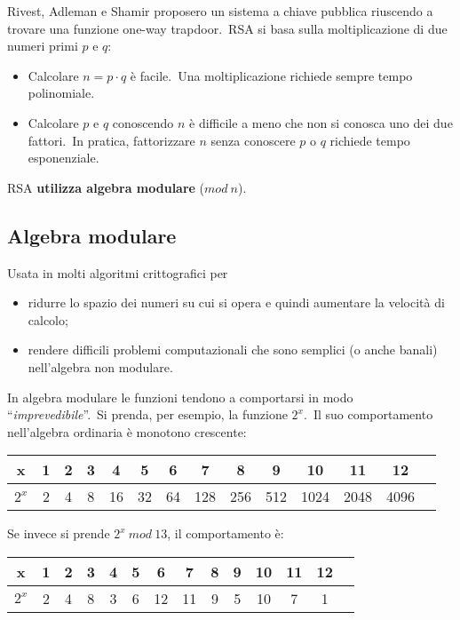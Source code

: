 Rivest, Adleman e Shamir proposero un sistema a chiave pubblica riuscendo a trovare una funzione one-way trapdoor.\
RSA si basa sulla moltiplicazione di due numeri primi $p$ e $q$:

\begin{itemize}
    \item Calcolare $n = p\cdot q$ è facile.\ Una moltiplicazione richiede sempre tempo polinomiale.
    \item Calcolare $p$ e $q$ conoscendo $n$ è difficile a meno che non si conosca uno dei due fattori.\ In pratica, fattorizzare $n$ senza conoscere $p$ o $q$ richiede tempo esponenziale.
\end{itemize}

\noindent RSA \textbf{utilizza algebra modulare} ($\mathit{mod}\ n$).

\subsection{Algebra modulare}

Usata in molti algoritmi crittografici per
\begin{itemize}
    \item ridurre lo spazio dei numeri su cui si opera e quindi aumentare la velocità di calcolo;
    \item rendere difficili problemi computazionali che sono semplici (o anche banali) nell'algebra non modulare.
\end{itemize}

\noindent In algebra modulare le funzioni tendono a comportarsi in modo ``\textit{imprevedibile}''.\
Si prenda, per esempio, la funzione $2^x$.\
Il suo comportamento nell'algebra ordinaria è monotono crescente:

\begin{table}[H]
    \centering
    \begin{tabular}{|c|c|c|c|c|c|c|c|c|c|c|c|c|c|}
        \hline
        x     & 1 & 2 & 3 & 4  & 5  & 6  & 7   & 8   & 9   & 10   & 11   & 12   \\\hline
        $2^x$ & 2 & 4 & 8 & 16 & 32 & 64 & 128 & 256 & 512 & 1024 & 2048 & 4096 \\\hline
    \end{tabular}
\end{table}

\noindent Se invece si prende $2^x\ \mathit{mod}\ 13$, il comportamento è:
\begin{table}[H]
    \centering
    \begin{tabular}{|c|c|c|c|c|c|c|c|c|c|c|c|c|c|}
        \hline
        x     & 1 & 2 & 3 & 4 & 5 & 6  & 7  & 8 & 9 & 10 & 11 & 12 \\\hline
        $2^x$ & 2 & 4 & 8 & 3 & 6 & 12 & 11 & 9 & 5 & 10 & 7  & 1  \\\hline
    \end{tabular}
\end{table}

